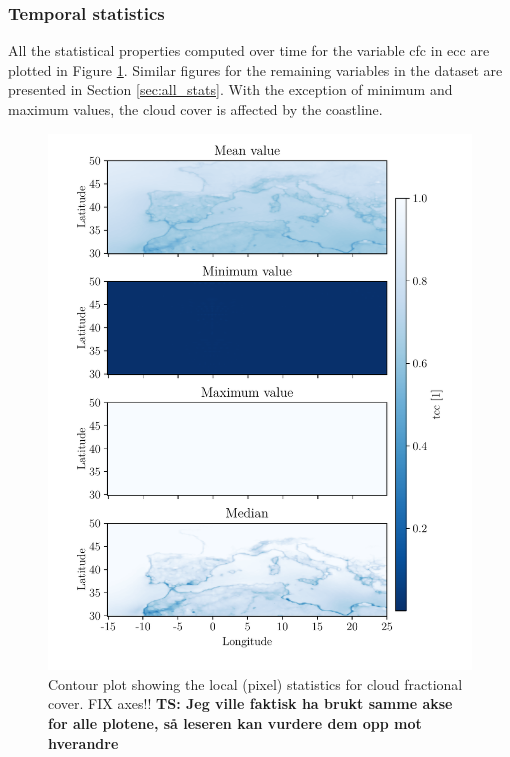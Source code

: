 \subsubsection{Temporal statistics}
All the statistical properties computed over time for the variable \acrshort{cfc} in \acrshort{ecc} are plotted in 
Figure \ref{fig:all_stats_tcc}. Similar figures for the remaining variables in the dataset are presented in Section \ref{sec:all_stats}. %
With the exception of minimum and maximum values, the cloud cover is affected by the coastline. 
\begin{figure}[ht]
    \centering
    \includegraphics{python_figs/all_stat_variable_tcc.pdf}
    \caption{Contour plot showing the local (pixel) statistics for cloud fractional cover. FIX axes!! \textbf{TS: Jeg ville faktisk ha brukt samme akse for alle plotene, så leseren kan vurdere dem opp mot hverandre} }
    \label{fig:all_stats_tcc}
\end{figure}

